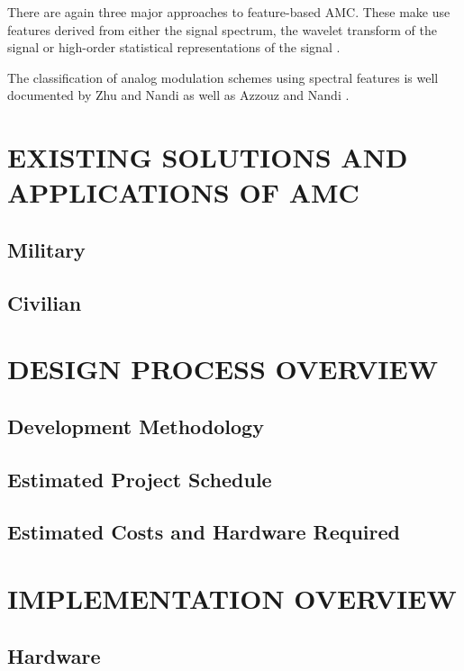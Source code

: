 \documentclass[10pt,twocolumn]{witseiepaper}
\begin{document}
	There are again three major approaches to feature-based AMC. These make use features derived from either the signal spectrum, the wavelet transform of the signal or high-order statistical representations of the signal \cite{zhu2014automatic}. 
	
	The classification of analog modulation schemes using spectral features is well documented by Zhu and Nandi \cite{zhu2014automatic} as well as Azzouz and Nandi \cite{azzouz2013automatic}.
	

\section{EXISTING SOLUTIONS AND APPLICATIONS OF AMC}
	\subsection{Military}
	\subsection{Civilian}

\section{DESIGN PROCESS OVERVIEW}
	\subsection{Development Methodology}
	\subsection{Estimated Project Schedule}
	\subsection{Estimated Costs and Hardware Required}

\section{IMPLEMENTATION OVERVIEW}
	\subsection{Hardware}
\end{document}
